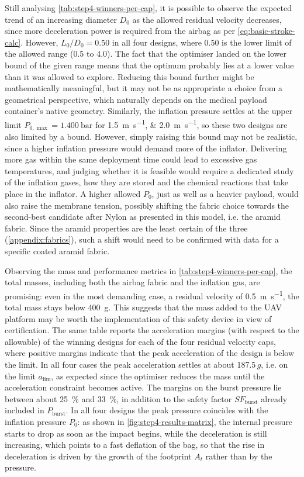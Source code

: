Still analysing \cref{tab:step4-winners-per-cap}, it is possible to observe the expected trend of an increasing diameter $D_0$ as the allowed residual velocity decreases, since more deceleration power is required from the airbag as per \cref{eq:basic-stroke-calc}. However, $L_0/D_0 = 0.50$ in all four designs, where 0.50 is the lower limit of the allowed range (0.5 to 4.0). The fact that the optimiser landed on the lower bound of the given range means that the optimum probably lies at a lower value than it was allowed to explore. Reducing this bound further might be mathematically meaningful, but it may not be as appropriate a choice from a geometrical perspective, which naturally depends on the medical payload container's native geometry. Similarly, the inflation pressure settles at the upper limit $P_{0,\max} = \qty{1.400}{\bar}$ for \qtylist{1.5;2.0}{\metre\per\second}, so these two designs are also limited by a bound. However, simply raising this bound may not be realistic, since a higher inflation pressure would demand more of the inflator. Delivering more gas within the same deployment time could lead to excessive gas temperatures, and judging whether it is feasible would require a dedicated study of the inflation gases, how they are stored and the chemical reactions that take place in the inflator. A higher allowed $P_0$, just as well as a heavier payload, would also raise the membrane tension, possibly shifting the fabric choice towards the second-best candidate after Nylon as presented in this model, i.e. the aramid fabric. Since the aramid properties are the least certain of the three (\cref{appendix:fabrics}), such a shift would need to be confirmed with data for a specific coated aramid fabric.

Observing the mass and performance metrics in \cref{tab:step4-winners-per-cap}, the total masses, including both the airbag fabric and the inflation gas, are promising: even in the most demanding case, a residual velocity of \qty{0.5}{\metre\per\second}, the total mass stays below \qty{400}{\gram}. This suggests that the mass added to the UAV platform may be worth the implementation of this safety device in view of certification. The same table reports the acceleration margins (with respect to the allowable) of the winning designs for each of the four residual velocity caps, where positive margins indicate that the peak acceleration of the design is below the limit. In all four cases the peak acceleration settles at about 187.5\,$g$, i.e. on the limit $a_\text{lim}$, as expected since the optimiser reduces the mass until the acceleration constraint becomes active. The margins on the burst pressure lie between about \qty{25}{\percent} and \qty{33}{\percent}, in addition to the safety factor $\mathit{SF}_\text{burst}$ already included in $P_\text{burst}$. In all four designs the peak pressure coincides with the inflation pressure $P_0$: as shown in \cref{fig:step4-results-matrix}, the internal pressure starts to drop as soon as the impact begins, while the deceleration is still increasing, which points to a fast deflation of the bag, so that the rise in deceleration is driven by the growth of the footprint $A_t$ rather than by the pressure.


